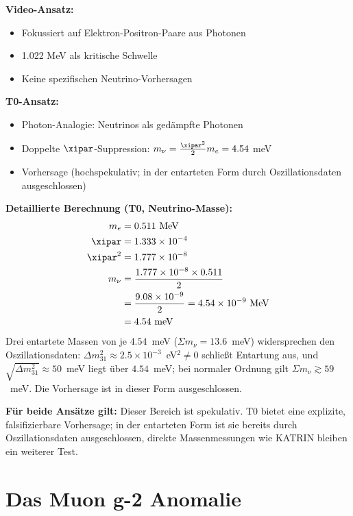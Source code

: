 	\begin{vergleich}
		\textbf{Video-Ansatz:}
		\begin{itemize}
			\item Fokussiert auf Elektron-Positron-Paare aus Photonen
			\item 1.022 MeV als kritische Schwelle
			\item Keine spezifischen Neutrino-Vorhersagen
		\end{itemize}
		
		\textbf{T0-Ansatz:}
		\begin{itemize}
			\item Photon-Analogie: Neutrinos als gedämpfte Photonen
			\item Doppelte $\xipar$-Suppression: $m_\nu = \frac{\xipar^2}{2} m_e = 4.54$ meV
			\item Vorhersage (hochspekulativ; in der entarteten Form durch Oszillationsdaten ausgeschlossen)
		\end{itemize}
		
		\textbf{Detaillierte Berechnung (T0, Neutrino-Masse):}
		\begin{align}
			m_e &= 0.511 \text{ MeV} \\
			\xipar &= 1.333 \times 10^{-4} \\
			\xipar^2 &= 1.777 \times 10^{-8} \\
			m_\nu &= \frac{1.777 \times 10^{-8} \times 0.511}{2} \\
			&= \frac{9.08 \times 10^{-9}}{2} = 4.54 \times 10^{-9} \text{ MeV} \\
			&= 4.54 \text{ meV}
		\end{align}
		Drei entartete Massen von je $4.54$~meV ($\Sigma m_\nu = 13.6$~meV) widersprechen den Oszillationsdaten: $\Delta m^2_{31} \approx 2.5\times10^{-3}$~eV$^2 \neq 0$ schließt Entartung aus, und $\sqrt{\Delta m^2_{31}} \approx 50$~meV liegt über $4.54$~meV; bei normaler Ordnung gilt $\Sigma m_\nu \gtrsim 59$~meV. Die Vorhersage ist in dieser Form ausgeschlossen.
	\end{vergleich}
	
	\textbf{Für beide Ansätze gilt:} Dieser Bereich ist spekulativ. T0 bietet eine explizite, falsifizierbare Vorhersage; in der entarteten Form ist sie bereits durch Oszillationsdaten ausgeschlossen, direkte Massenmessungen wie KATRIN \cite{katrin_2022} bleiben ein weiterer Test.
	
	\section{Das Muon g-2 Anomalie}
	

